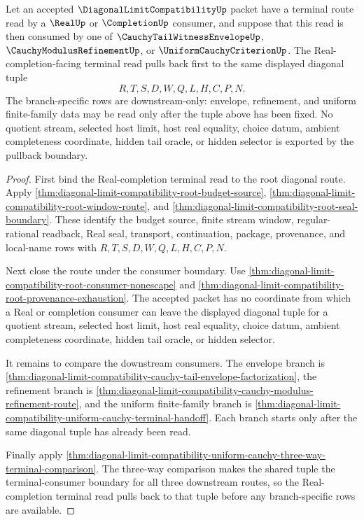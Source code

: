 \begin{theorem}
\label{thm:diagonal-limit-compatibility-real-completion-terminal-pullback}
Let an accepted $\DiagonalLimitCompatibilityUp$ packet have a terminal route
read by a $\RealUp$ or $\CompletionUp$ consumer, and suppose that this read is
then consumed by one of $\CauchyTailWitnessEnvelopeUp$,
$\CauchyModulusRefinementUp$, or $\UniformCauchyCriterionUp$. The
Real-completion-facing terminal read pulls back first to the same displayed
diagonal tuple
$$
R,T,S,D,W,Q,L,H,C,P,N.
$$
The branch-specific rows are downstream-only: envelope, refinement, and
uniform finite-family data may be read only after the tuple above has been
fixed. No quotient stream, selected host limit, host real equality, choice
datum, ambient completeness coordinate, hidden tail oracle, or hidden selector
is exported by the pullback boundary.
\end{theorem}
\begin{proof}
First bind the Real-completion terminal read to the root diagonal route. Apply
\autoref{thm:diagonal-limit-compatibility-root-budget-source},
\autoref{thm:diagonal-limit-compatibility-root-window-route}, and
\autoref{thm:diagonal-limit-compatibility-root-seal-boundary}. These identify
the budget source, finite stream window, regular-rational readback, Real seal,
transport, continuation, package, provenance, and local-name rows with
$R,T,S,D,W,Q,L,H,C,P,N$.

Next close the route under the consumer boundary. Use
\autoref{thm:diagonal-limit-compatibility-root-consumer-nonescape} and
\autoref{thm:diagonal-limit-compatibility-root-provenance-exhaustion}. The
accepted packet has no coordinate from which a Real or completion consumer can
leave the displayed diagonal tuple for a quotient stream, selected host limit,
host real equality, choice datum, ambient completeness coordinate, hidden tail
oracle, or hidden selector.

It remains to compare the downstream consumers. The envelope branch is
\autoref{thm:diagonal-limit-compatibility-cauchy-tail-envelope-factorization},
the refinement branch is
\autoref{thm:diagonal-limit-compatibility-cauchy-modulus-refinement-route}, and
the uniform finite-family branch is
\autoref{thm:diagonal-limit-compatibility-uniform-cauchy-terminal-handoff}.
Each branch starts only after the same diagonal tuple has already been read.

Finally apply
\autoref{thm:diagonal-limit-compatibility-uniform-cauchy-three-way-terminal-comparison}.
The three-way comparison makes the shared tuple the terminal-consumer boundary
for all three downstream routes, so the Real-completion terminal read pulls
back to that tuple before any branch-specific rows are available.
\end{proof}

